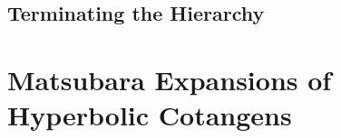 \section{Terminating the Hierarchy}
\label{sec:hierarchy.terminator}




\chapter{Matsubara Expansions of Hyperbolic Cotangens}
\label{cha:coth}
%


